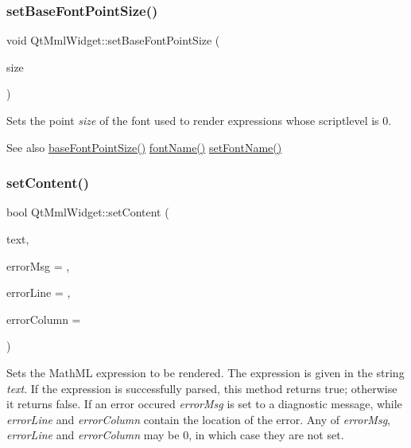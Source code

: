 \subsubsection{\texorpdfstring{set\+Base\+Font\+Point\+Size()}{setBaseFontPointSize()}}
{\footnotesize\ttfamily void Qt\+Mml\+Widget\+::set\+Base\+Font\+Point\+Size (\begin{DoxyParamCaption}\item[{int}]{size }\end{DoxyParamCaption})}

Sets the point {\itshape size} of the font used to render expressions whose scriptlevel is 0.

\begin{DoxySeeAlso}{See also}
\mbox{\hyperlink{class_qt_mml_widget_ab255d9d35bca5f04d5828fabed87d5af}{base\+Font\+Point\+Size()}} \mbox{\hyperlink{class_qt_mml_widget_ab8a069c5d6a449e3d9d67e6b818172d9}{font\+Name()}} \mbox{\hyperlink{class_qt_mml_widget_afbc5b98c9d39c328270a9d65d58b0b7a}{set\+Font\+Name()}} 
\end{DoxySeeAlso}
\mbox{\label{class_qt_mml_widget_acbf8373b12e69b14458b56bcb9ccc9c3}} 
\subsubsection{\texorpdfstring{set\+Content()}{setContent()}}
{\footnotesize\ttfamily bool Qt\+Mml\+Widget\+::set\+Content (\begin{DoxyParamCaption}\item[{const Q\+String \&}]{text,  }\item[{Q\+String $\ast$}]{error\+Msg = {},  }\item[{int $\ast$}]{error\+Line = {},  }\item[{int $\ast$}]{error\+Column = {} }\end{DoxyParamCaption})}

Sets the Math\+ML expression to be rendered. The expression is given in the string {\itshape text}. If the expression is successfully parsed, this method returns true; otherwise it returns false. If an error occured {\itshape error\+Msg} is set to a diagnostic message, while {\itshape error\+Line} and {\itshape error\+Column} contain the location of the error. Any of {\itshape error\+Msg}, {\itshape error\+Line} and {\itshape error\+Column} may be 0, in which case they are not set.

